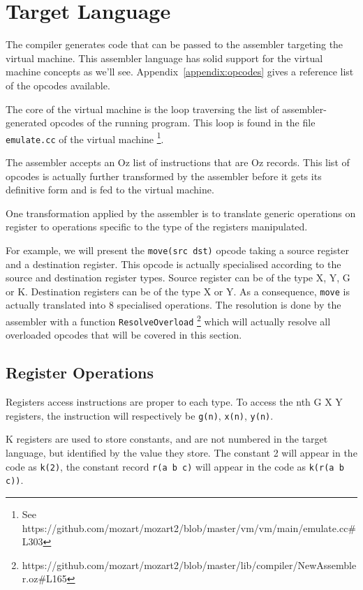 \documentclass[a4paper]{memoir}
\begin{document}
\section{Target Language}
The compiler generates code that can be passed to the assembler targeting the
virtual machine. This assembler language has solid support for the virtual
machine concepts as we'll see. Appendix~\ref{appendix:opcodes} gives a reference list of
the opcodes available.

The core of the virtual machine is the loop traversing the list of
assembler-generated opcodes of the running program. This loop is found in the file
\lstinline!emulate.cc! of the virtual
machine \cite{Moz2vmsrc} \footnote{See
https://github.com/mozart/mozart2/blob/master/vm/vm/main/emulate.cc\#L303}.

The assembler accepts an Oz list of instructions that are Oz records. This list
of opcodes is actually further transformed by
the assembler before it gets its definitive form and is fed to the virtual
machine.                                             

One transformation applied by the assembler is to translate generic operations
on register to operations specific to the type of the registers manipulated. 

For example, we will present the \lstinline!move(src dst)! opcode taking a
source register and a destination register. This opcode is actually
specialised according to the source and destination register types. Source
register can be of the type X, Y, G or K. Destination registers can be of the
type X or Y. As a consequence, \lstinline!move! is actually translated into
8 specialised operations. The resolution is done by the
assembler with a function
\lstinline!ResolveOverload! \cite{Moz2src}\footnote{https://github.com/mozart/mozart2/blob/master/lib/compiler/NewAssembler.oz\#L165} 
which will actually resolve all overloaded opcodes that will be covered in this section. 

\subsection{Register Operations}\label{sec:intro:opcode:registers}
Registers access instructions are proper to each type. To access the nth G X Y
registers, the instruction will respectively be \lstinline!g(n)!,
\lstinline!x(n)!, \lstinline!y(n)!. 

K registers are used to store constants, and are not numbered in the target
language, but identified by
the value they store. The constant 2 will appear in the code as
\lstinline!k(2)!, the constant record \lstinline!r(a b c)! will appear in the
code as \lstinline!k(r(a b c))!.
\end{document}
